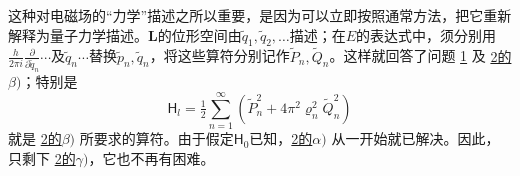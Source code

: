 \documentclass[fontsize=13pt,twoside,openany,headings=normal,parskip=false,bookmarkpackage=false,DIV=calc]{scrbook}
\begin{document}
这种对电磁场的“力学”描述之所以重要，是因为可以立即按照通常方法，把它重新解释为量子力学描述。$\boldsymbol{L}$的位形空间由$\widetilde q_1,\allowbreak \widetilde q_2,\allowbreak \ldots$描述；在$E$的表达式中，须分别用$\frac{h}{2\pi i}\frac{\partial}{\partial\widetilde q_n}\cdots$及$\widetilde q_n\cdots$替换$\widetilde p_n,\allowbreak \widetilde q_n$，将这些算符分别记作$\widetilde P_n,\allowbreak \widetilde Q_n$。\hypertarget{origpage-140}{}\label{origpage-140}这样就回答了问题 \hyperref[problem:III.6.1]{1} 及 \hyperref[problem:III.6.2beta]{2的$\beta)$}；特别是
\[
 \mathsf{H}_l=\tfrac12\sum_{n=1}^{\infty}(\widetilde P_n^2+4\pi^2\varrho_n^2\widetilde Q_n^2)
\]
就是 \hyperref[problem:III.6.2beta]{2的$\beta)$} 所要求的算符。由于假定$\mathsf{H}_0$已知，\hyperref[problem:III.6.2alpha]{2的$\alpha)$} 从一开始就已解决。因此，只剩下 \hyperref[problem:III.6.2gamma]{2的$\gamma)$}，它也不再有困难。
\end{document}
